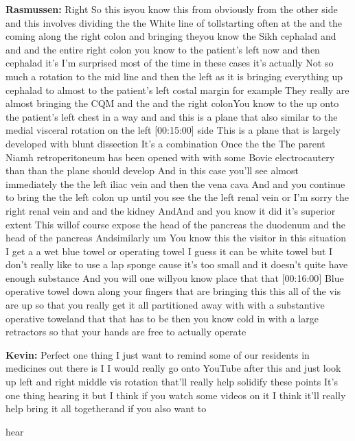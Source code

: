 \documentclass[
]{book}
\begin{document}
\textbf{Rasmussen:} Right So this isyou know this from obviously from the
other side and this involves dividing the the White line of tollstarting
often at the and the coming along the right colon and bringing theyou
know the Sikh cephalad and and and the entire right colon you know to
the patient's left now and then cephalad it's I'm surprised most of the
time in these cases it's actually Not so much a rotation to the mid line
and then the left as it is bringing everything up cephalad to almost to
the patient's left costal margin for example They really are almost
bringing the CQM and the and the right colonYou know to the up onto the
patient's left chest in a way and and this is a plane that also similar
to the medial visceral rotation on the left {[}00:15:00{]} side This is a
plane that is largely developed with blunt dissection It's a combination
Once the the The parent Niamh retroperitoneum has been opened with with
some Bovie electrocautery than than the plane should develop And in this
case you'll see almost immediately the the left iliac vein and then the
vena cava And and you continue to bring the the left colon up until you
see the the left renal vein or I'm sorry the right renal vein and and
the kidney AndAnd and you know it did it's superior extent This willof
course expose the head of the pancreas the duodenum and the head of the
pancreas Andsimilarly um You know this the visitor in this situation I
get a a wet blue towel or operating towel I guess it can be white towel
but I don't really like to use a lap sponge cause it's too small and it
doesn't quite have enough substance And you will one willyou know place
that that {[}00:16:00{]} Blue operative towel down along your fingers that
are bringing this this all of the vis are up so that you really get it
all partitioned away with with a substantive operative toweland that
that has to be then you know cold in with a large retractors so that
your hands are free to actually operate

\textbf{Kevin:} Perfect one thing I just want to remind some of our residents
in medicines out there is I I would really go onto YouTube after this
and just look up left and right middle vis rotation that'll really help
solidify these points It's one thing hearing it but I think if you watch
some videos on it I think it'll really help bring it all togetherand if
you also want to

hear
\end{document}
